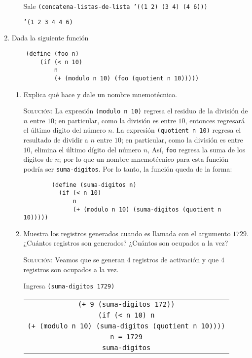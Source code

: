 \documentclass[letterpaper,11pt]{article}
\begin{document}
\begin{enumerate}
\begin{enumerate}
        Sale \texttt{(concatena-listas-de-lista '((1 2) (3 4) (4 6)))}
        \begin{center}
            \texttt{'(1 2 3 4 4 6)}
        \end{center}
    \end{enumerate}

    \item Dada la siguiente función 
    \begin{verbatim}
    (define (foo n)
        (if (< n 10)
            n
            (+ (modulo n 10) (foo (quotient n 10)))))
    \end{verbatim}

    \begin{enumerate}
        \item Explica qué hace y dale un nombre mnemotécnico.
        
        \textsc{Solución:} La expresión \texttt{(modulo n 10)} regresa el 
        residuo de la división de $n$ entre $10$; en particular, como la 
        división es entre $10$, entonces regresará el último digito del 
        número $n$. La expresión \texttt{(quotient n 10)} regresa el resultado
        de dividir a $n$ entre $10$; en particular, como la división es entre 
        $10$, elimina el último dígito del número $n$, Así, \texttt{foo} regresa 
        la suma de los dígitos de $n$; por lo que un nombre mnemotécnico para 
        esta función podría ser \texttt{suma-digitos}. Por lo tanto, la función 
        queda de la forma:
        \begin{verbatim}
        (define (suma-digitos n)
          (if (< n 10)
              n
              (+ (modulo n 10) (suma-digitos (quotient n 10)))))
        \end{verbatim}

        \item Muestra los registros generados cuando es llamada con el 
        argumento $1729$. ¿Cuántos registros son generados? ¿Cuántos son 
        ocupados a la vez?

        \textsc{Solución:} Veamos que se generan $4$ registros de activación 
        y que $4$ registros son ocupados a la vez.

        Ingresa \texttt{(suma-digitos 1729)}
        \begin{center}
            \begin{tabular}[h]{|c|}
                \hline
                \texttt{(+ 9 (suma-digitos 172))} \\
                \texttt{(if (< n 10) n} \\
                \texttt{(+ (modulo n 10) (suma-digitos (quotient n 10))))} \\ 
                \texttt{n = 1729} \\
                \texttt{suma-digitos} \\
                \hline
            \end{tabular}
        \end{center}


\end{enumerate}
\end{enumerate}
\end{document}
